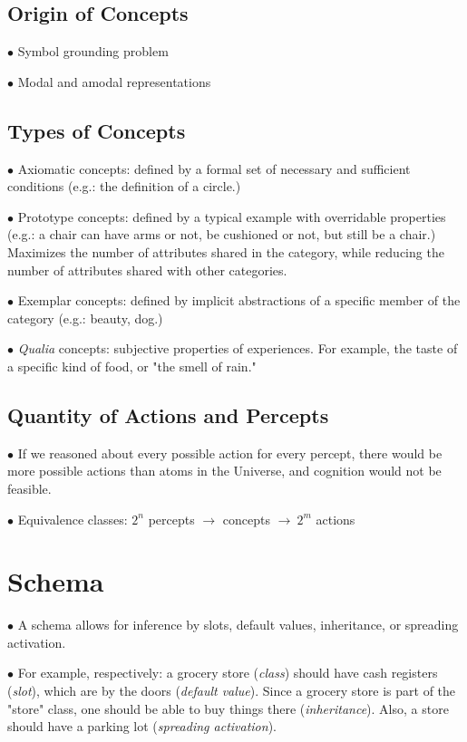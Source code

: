 \documentclass[english,openany]{book}
\begin{document}
\subsection{Origin of Concepts}

$\bullet$ Symbol grounding problem

$\bullet$ Modal and amodal representations

\subsection{Types of Concepts}

$\bullet$ Axiomatic concepts: defined by a formal set of necessary and sufficient conditions (e.g.: the definition of a circle.)

$\bullet$ Prototype concepts: defined by a typical example with overridable properties (e.g.: a chair can have arms or not, be cushioned or not, but still be a chair.) Maximizes the number of attributes shared in the category, while reducing the number of attributes shared with other categories.

$\bullet$ Exemplar concepts: defined by implicit abstractions of a specific member of the category (e.g.: beauty, dog.)

$\bullet$ \textit{Qualia} concepts: subjective properties of experiences. For example, the taste of a specific kind of food, or "the smell of rain."

\subsection{Quantity of Actions and Percepts}

$\bullet$ If we reasoned about every possible action for every percept, there would be more possible actions than atoms in the Universe, and cognition would not be feasible.

$\bullet$ Equivalence classes: $2^n$ percepts $\rightarrow$ concepts $\rightarrow\ 2^m$ actions

\section{Schema}

$\bullet$ A schema allows for inference by slots, default values, inheritance, or spreading activation.

$\bullet$ For example, respectively: a grocery store (\textit{class}) should have cash registers (\textit{slot}), which are by the doors (\textit{default value}). Since a grocery store is part of the "store" class, one should be able to buy things there (\textit{inheritance}). Also, a store should have a parking lot (\textit{spreading activation}).
\end{document}
